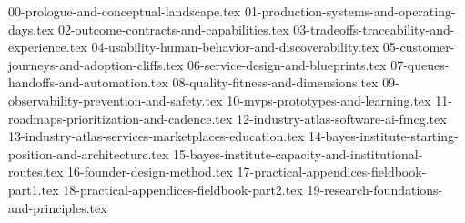 
{00-prologue-and-conceptual-landscape.tex}
{01-production-systems-and-operating-days.tex}
{02-outcome-contracts-and-capabilities.tex}
{03-tradeoffs-traceability-and-experience.tex}
{04-usability-human-behavior-and-discoverability.tex}
{05-customer-journeys-and-adoption-cliffs.tex}
{06-service-design-and-blueprints.tex}
{07-queues-handoffs-and-automation.tex}
{08-quality-fitness-and-dimensions.tex}
{09-observability-prevention-and-safety.tex}
{10-mvps-prototypes-and-learning.tex}
{11-roadmaps-prioritization-and-cadence.tex}
{12-industry-atlas-software-ai-fmcg.tex}
{13-industry-atlas-services-marketplaces-education.tex}
{14-bayes-institute-starting-position-and-architecture.tex}
{15-bayes-institute-capacity-and-institutional-routes.tex}
{16-founder-design-method.tex}
{17-practical-appendices-fieldbook-part1.tex}
{18-practical-appendices-fieldbook-part2.tex}
{19-research-foundations-and-principles.tex}
